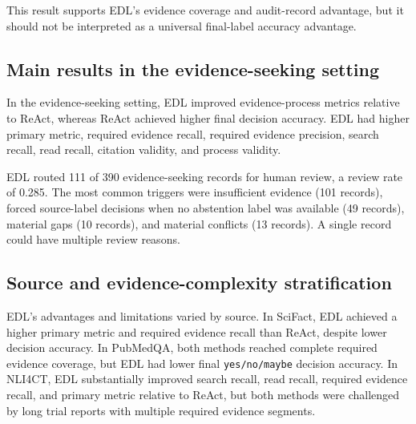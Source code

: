 \documentclass[11pt,a4paper]{article}
\begin{document}
This result supports EDL's evidence coverage and audit-record advantage, but it should not be interpreted as a universal final-label accuracy advantage.

\subsection{Main results in the evidence-seeking setting}

In the evidence-seeking setting, EDL improved evidence-process metrics relative to ReAct, whereas ReAct achieved higher final decision accuracy. EDL had higher primary metric, required evidence recall, required evidence precision, search recall, read recall, citation validity, and process validity.

\begin{table}[H]
\centering
\caption{Main evaluation results in the evidence-seeking setting.}
\end{table}

EDL routed 111 of 390 evidence-seeking records for human review, a review rate of 0.285. The most common triggers were insufficient evidence (101 records), forced source-label decisions when no abstention label was available (49 records), material gaps (10 records), and material conflicts (13 records). A single record could have multiple review reasons.

\subsection{Source and evidence-complexity stratification}

EDL's advantages and limitations varied by source. In SciFact, EDL achieved a higher primary metric and required evidence recall than ReAct, despite lower decision accuracy. In PubMedQA, both methods reached complete required evidence coverage, but EDL had lower final \texttt{yes/no/maybe} decision accuracy. In NLI4CT, EDL substantially improved search recall, read recall, required evidence recall, and primary metric relative to ReAct, but both methods were challenged by long trial reports with multiple required evidence segments.
\end{document}
